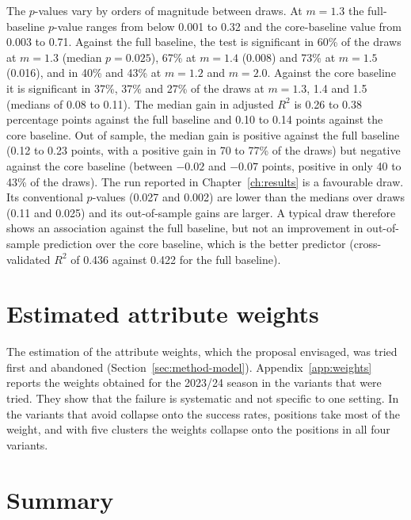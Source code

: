 The $p$-values vary by orders of magnitude between draws. At $m=1.3$ the full-baseline $p$-value ranges from below 0.001 to 0.32 and the core-baseline value from 0.003 to 0.71. Against the full baseline, the test is significant in 60\% of the draws at $m=1.3$ (median $p=0.025$), 67\% at $m=1.4$ (0.008) and 73\% at $m=1.5$ (0.016), and in 40\% and 43\% at $m=1.2$ and $m=2.0$. Against the core baseline it is significant in 37\%, 37\% and 27\% of the draws at $m=1.3$, 1.4 and 1.5 (medians of 0.08 to 0.11). The median gain in adjusted $R^2$ is 0.26 to 0.38 percentage points against the full baseline and 0.10 to 0.14 points against the core baseline. Out of sample, the median gain is positive against the full baseline (0.12 to 0.23 points, with a positive gain in 70 to 77\% of the draws) but negative against the core baseline (between $-0.02$ and $-0.07$ points, positive in only 40 to 43\% of the draws). The run reported in Chapter~\ref{ch:results} is a favourable draw. Its conventional $p$-values (0.027 and 0.002) are lower than the medians over draws (0.11 and 0.025) and its out-of-sample gains are larger. A typical draw therefore shows an association against the full baseline, but not an improvement in out-of-sample prediction over the core baseline, which is the better predictor (cross-validated $R^2$ of 0.436 against 0.422 for the full baseline).

\section{Estimated attribute weights}
\label{sec:rob-weights}

The estimation of the attribute weights, which the proposal envisaged, was tried first and abandoned (Section~\ref{sec:method-model}). Appendix~\ref{app:weights} reports the weights obtained for the 2023/24 season in the variants that were tried. They show that the failure is systematic and not specific to one setting. In the variants that avoid collapse onto the success rates, positions take most of the weight, and with five clusters the weights collapse onto the positions in all four variants.

\section{Summary}

